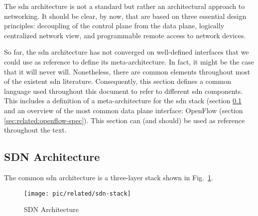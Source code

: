 The \gls{sdn} architecture is not a standard but rather an architectural approach to networking. 
It should be clear, by now, that  are based on three essential design principles: decoupling of the control plane from the data plane, logically centralized network view, and programmable remote access to network devices. 

So far, the \gls{sdn}  architecture has not converged on well-defined interfaces that we could use as reference to define its meta-architecture. 
In fact, it might be the case that it will never will. 
Nonetheless, there are common elements throughout most of the existent \gls{sdn} literature. 
Consequently, this section defines a common language  used throughout this document to refer to different \gls{sdn} components.
This includes a definition of a meta-architecture for the \gls{sdn} stack (section \ref{sec:related:sdn-architecture} and an overview of the most common data plane interface: OpenFlow (section \ref{sec:related:openflow-spec}). 
This section can (and should) be used as reference throughout the text. 

\subsection{SDN Architecture}
\label{sec:related:sdn-architecture}
The common \gls{sdn} architecture is a three-layer stack shown in Fig.~\ref{fig:related:sdn-stack}. 

\begin{figure}
  \centering
    \texttt{[image: pic/related/sdn-stack]}
  \caption{SDN Architecture}
  \label{fig:related:sdn-stack}
\end{figure}


